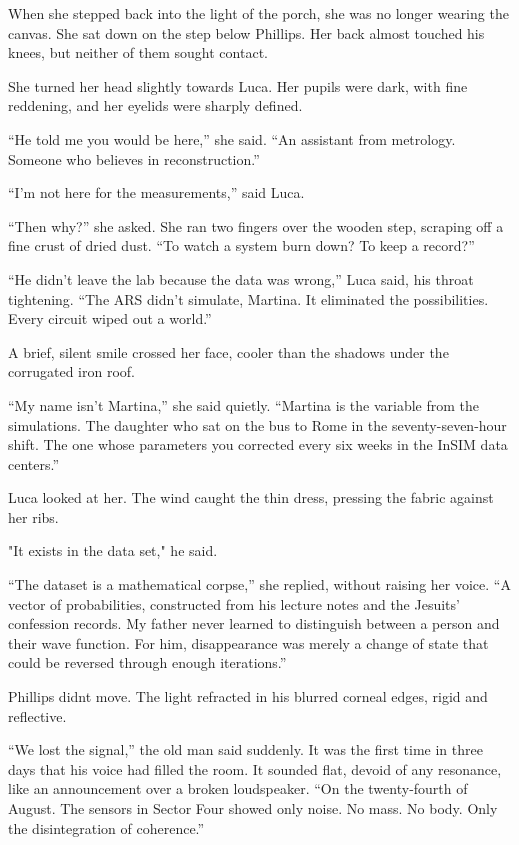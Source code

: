 \documentclass[
  ngerman,
]{article}
\begin{document}
When she stepped back into the light of the porch, she was no longer
wearing the canvas. She sat down on the step below Phillips. Her back
almost touched his knees, but neither of them sought contact.

She turned her head slightly towards Luca. Her pupils were dark, with
fine reddening, and her eyelids were sharply defined.

``He told me you would be here,'' she said. ``An assistant from
metrology. Someone who believes in reconstruction.''

``I'm not here for the measurements,'' said Luca.

``Then why?'' she asked. She ran two fingers over the wooden step,
scraping off a fine crust of dried dust. ``To watch a system burn down?
To keep a record?''

``He didn't leave the lab because the data was wrong,'' Luca said, his
throat tightening. ``The ARS didn't simulate, Martina. It eliminated the
possibilities. Every circuit wiped out a world.''

A brief, silent smile crossed her face, cooler than the shadows under
the corrugated iron roof.

``My name isn't Martina,'' she said quietly. ``Martina is the variable
from the simulations. The daughter who sat on the bus to Rome in the
seventy-seven-hour shift. The one whose parameters you corrected every
six weeks in the InSIM data centers.''

Luca looked at her. The wind caught the thin dress, pressing the fabric
against her ribs.

"It exists in the data set," he said.

``The dataset is a mathematical corpse,'' she replied, without raising
her voice. ``A vector of probabilities, constructed from his lecture
notes and the Jesuits' confession records. My father never learned to
distinguish between a person and their wave function. For him,
disappearance was merely a change of state that could be reversed
through enough iterations.''

Phillips didn\textquotesingle t move. The light refracted in his blurred
corneal edges, rigid and reflective.

``We lost the signal,'' the old man said suddenly. It was the first time
in three days that his voice had filled the room. It sounded flat,
devoid of any resonance, like an announcement over a broken loudspeaker.
``On the twenty-fourth of August. The sensors in Sector Four showed only
noise. No mass. No body. Only the disintegration of coherence.''
\end{document}
